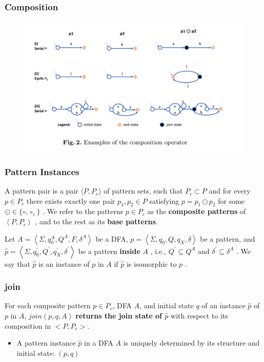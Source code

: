 \documentclass[aspectratio=169%
,serif,mathserif]{beamer}
\begin{document}
\begin{frame}
	\frametitle{Composition}
	\begin{figure}
		\includegraphics[width=0.8\linewidth]{1.png}
	\end{figure}
\end{frame}
	
\begin{frame}
	\frametitle{Pattern Instances}
	\begin{definition}
		A pattern pair is a pair $\langle P, P_{c}\rangle$ of pattern sets, 
		such that $P_{c} \subset P$  and for every $p \in P_{c}$ 
		there exists exactly one pair $p_{1}, p_{2} \in P$ satisfying  
		$p=p_{1} \odot p_{2}$  for some  $\odot \in \{\circ, \circ_{c} \}$ . 
		We refer to the patterns $p \in P_{c}$ as the \textbf{composite patterns} of  
		$\left\langle P, P_{c}\right\rangle$ , and to the rest as its \textbf{base patterns}.
	\end{definition}

	\begin{definition}
		Let $A=\left\langle\Sigma, q_{0}^{A}, Q^{A}, F, \delta^{A}\right\rangle$  be a DFA,  
		$p=\left\langle\Sigma, q_{0}, Q, q_{X}, \delta\right\rangle$  be a pattern, and
		$\hat{p}=\left\langle\Sigma, q_{0}^{\prime}, Q^{\prime}, q_{X}^{\prime}, \delta^{\prime}\right\rangle$ 
		be a pattern \textbf{inside} $A$ , i.e., $Q^{\prime} \subseteq Q^{A}$ 
		and $\delta^{\prime} \subseteq \delta^{A}$ .  We say that 
		$\hat{p}$  is an instance of  $p$  in  $A$  if  $\hat{p}$  is isomorphic to  $p$ . 
	\end{definition}
\end{frame}

\begin{frame}
	\frametitle{join}
	\begin{definition}[join]
		For each composite pattern $p \in P_c$, DFA $A$, and initial state $q$ of an
instance $\hat{p}$ of $p$ in $A$, $join(p, q, A)$ \textbf{returns the join state of $\hat{p}$} 
with respect to its composition in $<P, P_c>$.
	\end{definition}

	\begin{itemize}
		\item A pattern instance $\hat{p}$  in a DFA $A$ is uniquely determined by its structure and
		initial state: $(p,q)$
	\end{itemize}
\end{frame}
\end{document}
